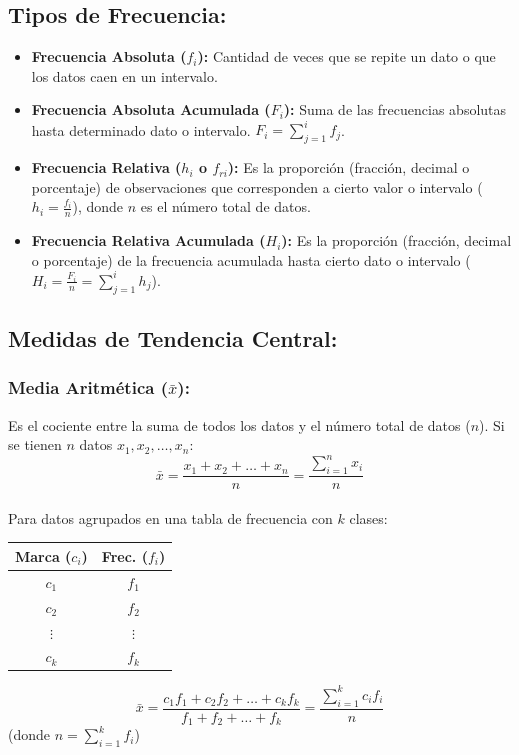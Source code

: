 \documentclass[12pt, letterpaper]{article}
\begin{document}
\subsection{Tipos de Frecuencia:}
\begin{itemize}
	\item \textbf{Frecuencia Absoluta ($f_i$):} Cantidad de veces que se repite un dato o que los datos caen en un intervalo.
	\item \textbf{Frecuencia Absoluta Acumulada ($F_i$):} Suma de las frecuencias absolutas hasta determinado dato o intervalo. $F_i = \sum_{j=1}^{i} f_j$.
	\item \textbf{Frecuencia Relativa ($h_i$ o $f_{ri}$):} Es la proporción (fracción, decimal o porcentaje) de observaciones que corresponden a cierto valor o intervalo ($h_i = \frac{f_i}{n}$), donde $n$ es el número total de datos.
	\item \textbf{Frecuencia Relativa Acumulada ($H_i$):} Es la proporción (fracción, decimal o porcentaje) de la frecuencia acumulada hasta cierto dato o intervalo ($H_i = \frac{F_i}{n} = \sum_{j=1}^{i} h_j$).
\end{itemize}
\newpage

\subsection{Medidas de Tendencia Central:}

\subsubsection{Media Aritmética ($\bar{x}$):}
Es el cociente entre la suma de todos los datos y el número total de datos ($n$). Si se tienen $n$ datos $x_1, x_2, \dots, x_n$:
\[ \bar{x}=\frac{x_1+x_2+\dots+x_n}{n} = \frac{\sum_{i=1}^{n} x_i}{n} \] \\
Para datos agrupados en una tabla de frecuencia con $k$ clases:
\begin{center}
	\begin{minipage}{0.35\textwidth}
		\centering
		\begin{tabular}{|c|c|}
			\hline
			\textbf{Marca ($c_i$)} & \textbf{Frec. ($f_i$)} \\
			\hline
			$c_1$ & $f_1$ \\ \hline
			$c_2$ & $f_2$ \\ \hline
			$\vdots$ & $\vdots$ \\ \hline
			$c_k$ & $f_k$ \\
			\hline
		 \end{tabular}
	\end{minipage}
	\hfill
	\begin{minipage}{0.55\textwidth}
		\centering
		\[ \bar{x}=\frac{c_1 f_1 + c_2 f_2 + \dots + c_k f_k}{f_1+f_2+\dots+f_k} = \frac{\sum_{i=1}^{k} c_i f_i}{n} \]
		(donde $n = \sum_{i=1}^{k} f_i$)
	\end{minipage}
\end{center}
\end{document}
